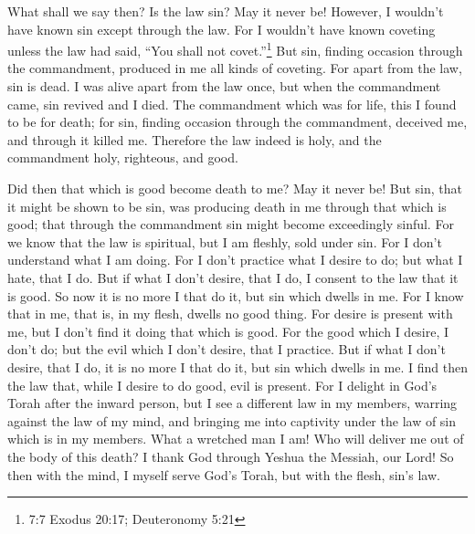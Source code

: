 \myverse{}What shall we say then? Is the law sin? May it never be! However,
I wouldn’t have known sin except through the law. For I wouldn’t have known coveting unless the law had
said, “You shall not covet.”\footnote{7:7 Exodus 20:17;
	Deuteronomy 5:21}
\myverse{}But sin, finding occasion through the commandment, produced in me all kinds
of coveting. For apart from the law, sin is dead.
\myverse{}I was alive apart from the law once, but when the commandment came, sin revived
and I died.
\myverse{}The commandment which was for life, this I found to be for death;
\myverse{}for sin, finding occasion through the commandment, deceived me, and through
it killed me.
\myverse{}Therefore the law indeed is holy, and the commandment holy, righteous, and
good.

\myverse{}Did then that which is good become death to me? May it never
be! But sin, that it might be shown to be sin, was producing death in me through that which is good; that
through the commandment sin might become exceedingly sinful.
\myverse{}For we know that the law is spiritual, but I am fleshly, sold under sin.
\myverse{}For I don’t understand what I am doing. For I don’t practice what I desire
to do; but what I hate, that I do.
\myverse{}But if what I don’t desire, that I do, I consent to the law that it is good.
\myverse{}So now it is no more I that do it, but sin which dwells in me.
\myverse{}For I know that in me, that is, in my flesh, dwells no good thing. For desire
is present with me, but I don’t find it doing that which is good.
\myverse{}For the good which I desire, I don’t do; but the evil which I don’t desire,
that I practice.
\myverse{}But if what I don’t desire, that I do, it is no more I that do it, but sin
which dwells in me.
\myverse{}I find then the law that, while I desire to do good, evil is present.
\myverse{}For I delight in God’s Torah after the inward person,
\myverse{}but I see a different law in my members, warring against the law of my mind,
and bringing me into captivity under the law of sin which is in my members.
\myverse{}What a wretched man I am! Who will deliver me out of the body of this death?
\myverse{}I thank God through Yeshua the Messiah, our Lord! So then with the mind, I
myself serve God’s Torah, but with the flesh, sin’s law.


